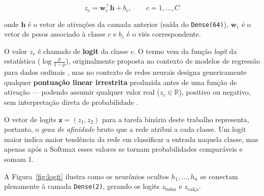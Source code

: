 \documentclass[12pt,a4paper]{article}
\begin{document}
\begin{equation}
  z_c = \mathbf{w}_c^\top \mathbf{h} + b_c, \qquad c = 1, \ldots, C
  \label{eq:logit}
\end{equation}

onde $\mathbf{h}$ é o vetor de ativações da camada anterior (saída do
\texttt{Dense(64)}), $\mathbf{w}_c$ é o vetor de pesos associado à classe $c$
e $b_c$ é o viés correspondente.

O valor $z_c$ é chamado de \textbf{logit} da classe $c$. O termo vem da
função \emph{logit} da estatística ($\log\frac{p}{1-p}$), originalmente
proposta no contexto de modelos de regressão para dados ordinais
\cite{mccullagh1980regression}, mas no contexto de redes neurais designa
genericamente qualquer \textbf{pontuação linear irrestrita} produzida antes
de uma função de ativação --- podendo assumir qualquer valor real
($z_c \in \mathbb{R}$), positivo ou negativo, sem interpretação direta de
probabilidade \cite{goodfellow2016deep}.

O vetor de logits $\mathbf{z} = (z_1, z_2)$ para a tarefa binária
deste trabalho representa, portanto, o \emph{grau de afinidade} bruto
que a rede atribui a cada classe. Um logit maior indica maior tendência
da rede em classificar a entrada naquela classe, mas apenas após a
Softmax esses valores se tornam probabilidades comparáveis e somam 1.

A Figura~\ref{fig:logit} ilustra como os neurônios ocultos $h_1,\ldots,h_n$
se conectam plenamente à camada \texttt{Dense(2)}, gerando os logits
$z_{\text{bolsa}}$ e $z_{\text{calça}}$.
\end{document}

